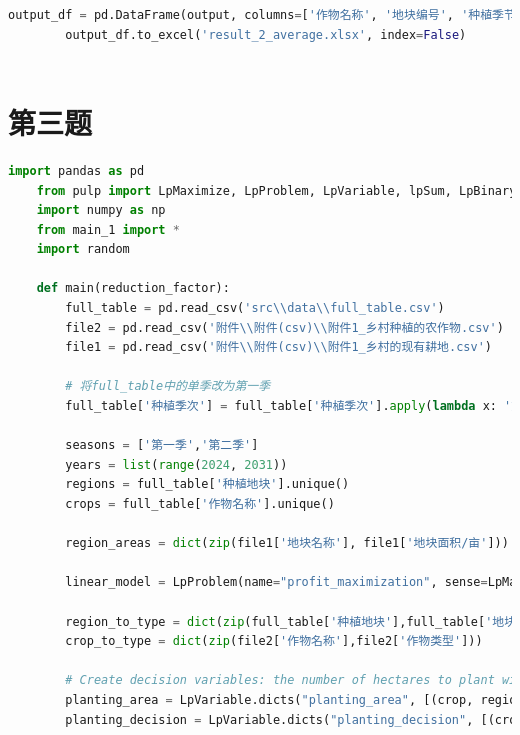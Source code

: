 \documentclass[withoutpreface]{cumcmthesis}
\begin{document}
\begin{appendices}
\begin{lstlisting}[language=python]
        output_df = pd.DataFrame(output, columns=['作物名称', '地块编号', '种植季节','年份', '种植数量'])
        output_df.to_excel('result_2_average.xlsx', index=False)
    
\end{lstlisting}

\newpage
\section{第三题}
\begin{lstlisting}[language=python]
    import pandas as pd
    from pulp import LpMaximize, LpProblem, LpVariable, lpSum, LpBinary
    import numpy as np
    from main_1 import *
    import random
    
    def main(reduction_factor):
        full_table = pd.read_csv('src\\data\\full_table.csv')
        file2 = pd.read_csv('附件\\附件(csv)\\附件1_乡村种植的农作物.csv')
        file1 = pd.read_csv('附件\\附件(csv)\\附件1_乡村的现有耕地.csv')
        
        # 将full_table中的单季改为第一季
        full_table['种植季次'] = full_table['种植季次'].apply(lambda x: '第一季' if x == '单季' else x)
    
        seasons = ['第一季','第二季']
        years = list(range(2024, 2031))
        regions = full_table['种植地块'].unique()
        crops = full_table['作物名称'].unique()
    
        region_areas = dict(zip(file1['地块名称'], file1['地块面积/亩']))
        
        linear_model = LpProblem(name="profit_maximization", sense=LpMaximize)
        
        region_to_type = dict(zip(full_table['种植地块'],full_table['地块类型']))
        crop_to_type = dict(zip(file2['作物名称'],file2['作物类型']))
    
        # Create decision variables: the number of hectares to plant with [each crop] in [each region] at [each year] at [each season] and the decision to plant or not
        planting_area = LpVariable.dicts("planting_area", [(crop, region, year, season) for crop in crops for region in regions for year in years for season in seasons], lowBound=0, cat='Continuous')
        planting_decision = LpVariable.dicts("planting_decision", [(crop, region, year, season) for crop in crops for region in regions for year in years for season in seasons], cat='Binary')
    

\end{lstlisting}
\end{appendices}
\end{document}
